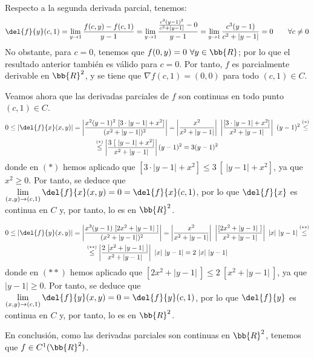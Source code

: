 \begin{ejercicio}
    Respecto a la segunda derivada parcial, tenemos:
    \begin{equation*}
        \del{f}{y}(c,1) = \lim_{y\to 1}\frac{f(c,y) - f(c,1)}{y-1}
        = \lim_{y\to 1}\frac{\frac{c^3(y-1)^2}{c^2+|y-1|} - 0}{y-1}
        = \lim_{y\to 1}\frac{c^3(y-1)}{c^2+|y-1|} = 0 \qquad \forall c\neq 0
    \end{equation*}
    No obstante, para $c=0$, tenemos que $f(0,y)=0~\forall y\in \bb{R}$; por lo que el resultado anterior también es válido para $c=0$. Por tanto, $f$ es parcialmente derivable en $\bb{R}^2$, y se tiene que $\nabla f(c,1)=(0,0)$ para todo $(c,1)\in C$.

    Veamos ahora que las derivadas parciales de $f$ son continuas en todo punto $(c,1)\in C$.
    \begin{multline*}
        0 \leq \left|\del{f}{x}(x,y)\right|
        = \left|\frac{x^2(y-1)^2~[3\cdot|y-1|+x^2]}{(x^2+|y-1|)^2}\right|
        = \left|\frac{x^2}{x^2+|y-1|}\right|~\left|\frac{[3\cdot |y-1|+x^2]}{x^2+|y-1|}\right| ~(y-1)^2 \stackrel{(\ast)}{\leq} \\
        \stackrel{(\ast)}{\leq} \left|\frac{3~[~|y-1|+x^2]}{x^2+|y-1|}\right| (y-1)^2 =3(y-1)^2
    \end{multline*}
    donde en $(\ast)$ hemos aplicado que $[3\cdot|y-1|+x^2]\leq 3~[~|y-1|+x^2]$, ya que $x^2\geq 0$. Por tanto, se deduce que $\lim\limits_{(x,y)\to (c,1)}\del{f}{x}(x,y) = 0 = \del{f}{x}(c,1)$, por lo que $\del{f}{x}$ es continua en $C$ y, por tanto, lo es en $\bb{R}^2$.

    
    \begin{multline*}
        0 \leq \left|\del{f}{y}(x,y)\right|
        = \left|\frac{x^3(y-1)~[2x^2+|y-1|~]}{(x^2+|y-1|)^2}\right|
        = \left|\frac{x^2}{x^2+|y-1|}\right|~\left|\frac{[2x^2+|y-1|~]}{x^2+|y-1|}\right| ~|x|~|y-1| \stackrel{(\ast\ast)}{\leq} \\
        \stackrel{(\ast\ast)}{\leq} \left|\frac{2~[x^2+|y-1|~]}{x^2+|y-1|}\right| ~|x|~|y-1| = 2~|x|~|y-1|
    \end{multline*}
    donde en $(\ast\ast)$ hemos aplicado que $[2x^2+|y-1|~]\leq 2~[x^2+|y-1|~]$, ya que $|y-1|\geq 0$. Por tanto, se deduce que $\lim\limits_{(x,y)\to (c,1)}\del{f}{y}(x,y) = 0 = \del{f}{y}(c,1)$, por lo que $\del{f}{y}$ es continua en $C$ y, por tanto, lo es en $\bb{R}^2$.

    En conclusión, como las derivadas parciales son continuas en $\bb{R}^2$, tenemos que $f\in C^1(\bb{R}^2)$.
\end{ejercicio}





